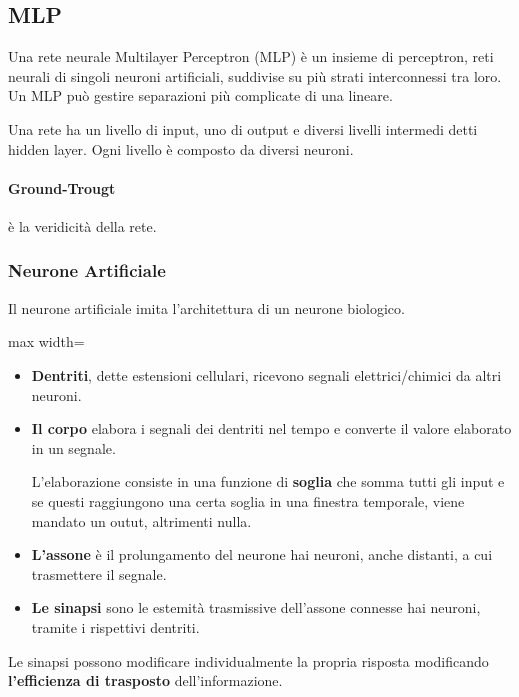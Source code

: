 \subsection{MLP}
Una rete neurale Multilayer Perceptron (MLP) è un insieme di perceptron, reti neurali di singoli neuroni artificiali, suddivise su più strati interconnessi tra loro. Un MLP può gestire separazioni più complicate di una lineare.

Una rete ha un livello di input, uno di output e diversi livelli intermedi detti hidden layer. Ogni livello è composto da diversi neuroni.
\paragraph{Ground-Trougt} è la veridicità della rete.
\subsubsection{Neurone Artificiale}
Il neurone artificiale imita l'architettura di un neurone biologico.
\begin{center}
	\begin{adjustbox}{max width=\textwidth}
	\end{adjustbox}
\end{center}
\begin{itemize}
	\item \textbf{Dentriti}, dette estensioni cellulari, ricevono segnali elettrici/chimici da altri neuroni.
	\item \textbf{Il corpo} elabora i segnali dei dentriti nel tempo e converte il valore elaborato in un segnale.

	L'elaborazione consiste in una funzione di \textbf{soglia} che somma tutti gli input e se questi raggiungono una certa soglia in una finestra temporale, viene mandato un outut, altrimenti nulla.
	\item \textbf{L'assone} è il prolungamento del neurone hai neuroni, anche distanti, a cui trasmettere il segnale.
	\item \textbf{Le sinapsi} sono le estemità trasmissive dell'assone connesse hai neuroni, tramite i rispettivi dentriti.
\end{itemize}
Le sinapsi possono modificare individualmente la propria risposta modificando \textbf{l'efficienza di trasposto} dell'informazione.

